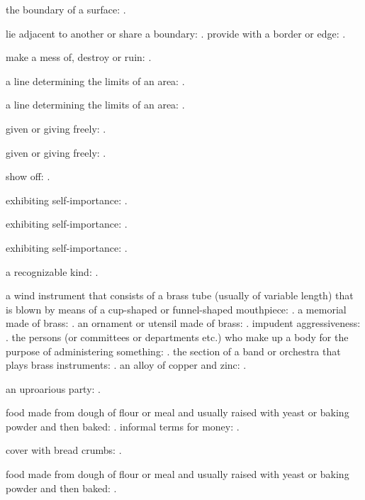   the boundary of a surface: .

  lie adjacent to another or share a boundary: . provide with a border or edge: .

  make a mess of, destroy or ruin: .

  a line determining the limits of an area: .

  a line determining the limits of an area: .

  given or giving freely: .

  given or giving freely: .

  show off: .

  exhibiting self-importance: .

  exhibiting self-importance: .

  exhibiting self-importance: .

  a recognizable kind: .

  a wind instrument that consists of a brass tube (usually of variable length) that is blown by means of a cup-shaped or funnel-shaped mouthpiece: . a memorial made of brass: . an ornament or utensil made of brass: . impudent aggressiveness: . the persons (or committees or departments etc.) who make up a body for the purpose of administering something: . the section of a band or orchestra that plays brass instruments: . an alloy of copper and zinc: .

  an uproarious party: .

  food made from dough of flour or meal and usually raised with yeast or baking powder and then baked: . informal terms for money: .

  cover with bread crumbs: .

  food made from dough of flour or meal and usually raised with yeast or baking powder and then baked: .

